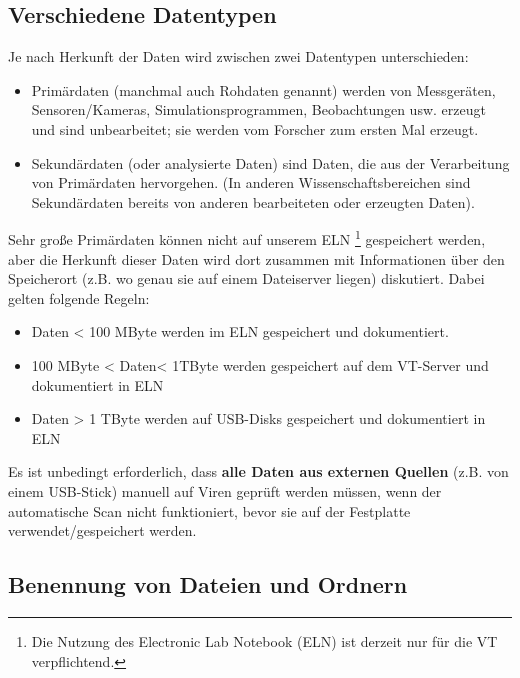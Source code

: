 \subsection{Verschiedene Datentypen}
Je nach Herkunft der Daten wird zwischen zwei Datentypen unterschieden:
\begin{itemize}
  \item Primärdaten (manchmal auch Rohdaten genannt) werden von Messgeräten,
        Sensoren/Kameras, Simulationsprogrammen, Beobachtungen usw. erzeugt
        und sind unbearbeitet; sie werden vom Forscher zum ersten Mal erzeugt.
  \item Sekundärdaten (oder analysierte Daten) sind Daten, die aus der
        Verarbeitung von Primärdaten hervorgehen. (In anderen
        Wissenschaftsbereichen sind Sekundärdaten bereits von anderen
        bearbeiteten oder erzeugten Daten).
\end{itemize}
Sehr große Primärdaten können nicht auf unserem ELN%
  \footnote{%
    Die Nutzung des Electronic Lab Notebook (ELN) ist derzeit nur
    für die VT verpflichtend.
  }%
gespeichert werden, aber die Herkunft dieser Daten wird dort zusammen mit
Informationen über den Speicherort (z.B. wo genau sie auf einem Dateiserver
liegen) diskutiert. Dabei gelten folgende Regeln:
\begin{itemize}
  \item Daten < 100 MByte werden im ELN gespeichert und dokumentiert.
  \item 100 MByte < Daten< 1TByte werden gespeichert auf dem VT-Server und
        dokumentiert in ELN
  \item Daten > 1 TByte werden auf USB-Disks gespeichert und dokumentiert in ELN
\end{itemize}
Es ist unbedingt erforderlich, dass \textbf{alle Daten aus externen Quellen} (z.B. von einem USB-Stick) manuell auf Viren geprüft werden müssen, wenn der automatische Scan nicht funktioniert, bevor sie auf der Festplatte verwendet/gespeichert werden.

\subsection{Benennung von Dateien und Ordnern }

